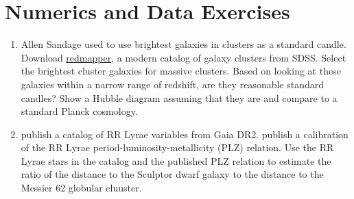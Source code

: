 \section{Numerics and Data Exercises}

\begin{enumerate}
\item Allen Sandage used to use brightest galaxies in clusters as a
   standard
   candle. Download \href{http://risa.stanford.edu/redmapper/}{redmapper},
   a modern catalog of galaxy clusters from SDSS. Select the brightest
   cluster galaxies for massive clusters. Based on looking at these
   galaxies within a narrow range of redshift, are they reasonable
   standard candles? Show a Hubble diagram assuming that they are and
   compare to a standard Planck cosmology.
\item \citet{clementini18a} publish a catalog of RR Lyrae variables
   from Gaia DR2. \citet{muraveva18a} publish a calibration of the RR
   Lyrae period-luminosity-metallicity (PLZ) relation. Use the RR
   Lyrae stars in the catalog and the published PLZ relation to
   estimate the ratio of the distance to the Sculptor dwarf galaxy to
   the distance to the Messier 62 globular cluuster.
\end{enumerate}


  
